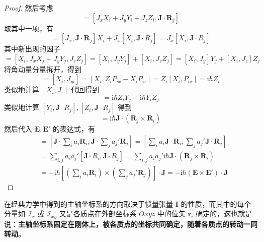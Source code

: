 \documentclass[cn,10pt,math=newtx,citestyle=gb7714-2015,bibstyle=gb7714-2015]{elegantbook}
\def\bm{\boldsymbol}
\def\mbf{\mathbf}
\def\mc{\mathcal}
\def\i{\mathrm i}
\begin{document}
\begin{proof}
    然后考虑
    \begin{equation}
        [\bm J\cdot\bm R_i,\bm J\cdot\bm R_j] = [J_xX_i+J_yY_i+J_zZ_i,\bm J\cdot\bm R_j]
    \end{equation}
    取其中一项，有
    \begin{equation}
        [J_xX_i,\bm J\cdot \bm R_i] = [J_x,\bm J\cdot\bm R_j]X_i+J_x[X_i,\bm J\cdot R_j] = J_x[X_i,\bm J\cdot R_j]
    \end{equation}
    其中新出现的因子
    \begin{equation}
        [X_i,\bm J\cdot\bm R_j] = [X_i,J_xX_j+J_yY_j,J_zZ_j]
        = [X_i,J_yY_j]+[X_i,J_zZ_j]
        = [X_i,J_y]Y_j+[X_i,J_z]Z_j
    \end{equation}
    将角动量分量拆开，得到
    \begin{equation}
        [X_i,J_y] = [X_i,J_{yi}] = [X_i,Z_iP_{ix}-X_iP_{iz}]  = Z_i[X_i, P_{ix}] = \i\hbar Z_i
    \end{equation}
    类似地计算 $[X_i,J_z]$ 代回得到
    \begin{equation}
        [X_i,\bm J\cdot\bm R_j] = \i\hbar Z_iY_j - \i\hbar Y_i Z_j
    \end{equation}
    类似地计算 $[Y_i,\bm J\cdot R_j],[Z_i,\bm J\cdot R_j]$ 得到
    \begin{equation}
        [\bm J\cdot\bm R_i,\bm J\cdot\bm R_j] = \i\hbar\bm J\cdot(\bm R_j\times\bm R_i)
    \end{equation}
    然后代入 $\bm E,\bm E'$ 的表达式，有
    \begin{align}
        [\bm J\cdot\bm E,\bm J\cdot\bm E'] &= \left[\bm J\cdot\sum_ia_i\bm R_i,\bm J\cdot\sum_ja_j'\bm R_j\right] = \left[\sum_ia_i\bm J\cdot\bm R_i,\sum_ja_j'\bm J\cdot\bm R_j\right]\nonumber\\
        & = \sum_{i,j}a_ia_j'[\bm J\cdot R_i,\bm J\cdot R_j] = \sum_{i,j}a_ia_j'\i\hbar\bm J\cdot(\bm R_j\times\bm R_i)\nonumber\\
        & = -\i\hbar\left[\left(\sum_ia_i\bm R_i\right)\times\left(\sum_ja_j'\bm R_j\right)\right]\cdot\bm J = -\i\hbar(\bm E\times\bm E')\cdot\bm J
    \end{align}
\end{proof}

在经典力学中得到的主轴坐标系的方向取决于惯量张量 $\mbf I$ 的性质，而其中的每个分量如 $\mc I_x$ 或 $\mc I_{xy}$ 又是各质点在外部坐标系 $Oxyz$ 中的位矢 $\bm r_i$ 确定的，这也就是说：\textbf{主轴坐标系固定在刚体上，被各质点的坐标共同确定，随着各质点的转动一同转动}。
\end{document}

